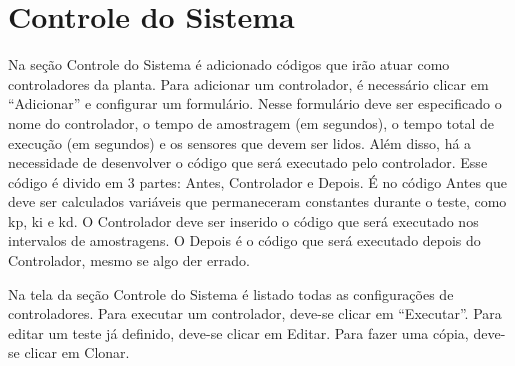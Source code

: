 
\chapter{Controle do Sistema}%
\label{chapter:controle-do-sistema}

Na seção Controle do Sistema é adicionado códigos que irão atuar como
controladores da planta. Para adicionar um controlador, é necessário clicar em
“Adicionar” e configurar um formulário. Nesse formulário deve ser especificado o
nome do controlador, o tempo de amostragem (em segundos), o tempo total de
execução (em segundos) e os sensores que devem ser lidos. Além disso, há a
necessidade de desenvolver o código que será executado pelo controlador. Esse
código é divido em 3 partes: Antes, Controlador e Depois. É no código Antes que
deve ser calculados variáveis que permaneceram constantes durante o teste, como
kp, ki e kd. O Controlador deve ser inserido o código que será executado nos
intervalos de amostragens. O Depois é o código que será executado depois do
Controlador, mesmo se algo der errado.

Na tela da seção Controle do Sistema é listado todas as configurações de
controladores. Para executar um controlador, deve-se clicar em “Executar”. Para
editar um teste já definido, deve-se clicar em Editar. Para fazer uma cópia,
deve-se clicar em Clonar. 
